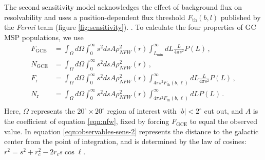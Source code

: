 \documentclass[a4paper,11pt]{article}
\newcommand{\comment}[1]{\emph{\color{red}{#1}}}
\begin{document}
The second sensitivity model acknowledges the effect of background flux on resolvability and uses a position-dependent flux threshold $F_\text{th}(b, l)$ published by the \textit{Fermi} team \cite{Fermi-LAT:2019yla, Ballet:2020hze} (figure \ref{fig:sensitivity}). \comment{Here, I could talk about how to convert between flux and luminosity and then use the mean of this map to assess how accurate 1e34 ergs/s actually is. One way would be simply to average over all the pixels in the sensitivity map and convert to luminosity. But isn't it better to weight the average by NFW distribution? In that case, I have to do a line of sight integral too, which means I can no longer use the flux to luminosity ratio in the appendix. It gets complicated...}. To calculate the four properties of GC MSP populations, we use
\begin{equation}
    \begin{split}
        F_\text{GCE} &= \int_\Omega d\Omega \int_0^\infty s^2 ds A \rho_{NFW}^2(r)\int_{L_\text{min}}^\infty dL \frac{L}{4\pi s^2}P(L)\,, \\
        N_\text{GCE} &= \int_\Omega d\Omega \int_0^\infty s^2 ds A \rho_{NFW}^2(r)\,, \\
        F_\text{r} &= \int_\Omega d\Omega \int_0^\infty s^2 ds A \rho_{NFW}^2(r)\int_{4\pi s^2F_\text{th}(b,\ell)}^\infty dL \frac{L}{4\pi s^2}P(L)\,, \\
        N_\text{r} &= \int_\Omega d\Omega \int_0^\infty s^2 ds A \rho_{NFW}^2(r)\int_{4\pi s^2F_\text{th}(b,\ell)}^\infty dL P(L) \,. \\
        \label{eqn:observables-sens-2}
    \end{split}
\end{equation}
Here, $\Omega$ represents the $20^\circ \times 20^\circ$ region of interest with $|b| < 2^\circ$ cut out, and $A$ is the coefficient of equation \ref{eqn:nfw}, fixed by forcing $F_\text{GCE}$ to equal the observed value. In equation \ref{eqn:observables-sens-2} represents the distance to the galactic center from the point of integration, and is determined by the law of cosines:
$r^2 = s^2 + r_c^2 - 2r_c s \cos \ell$.
\end{document}
